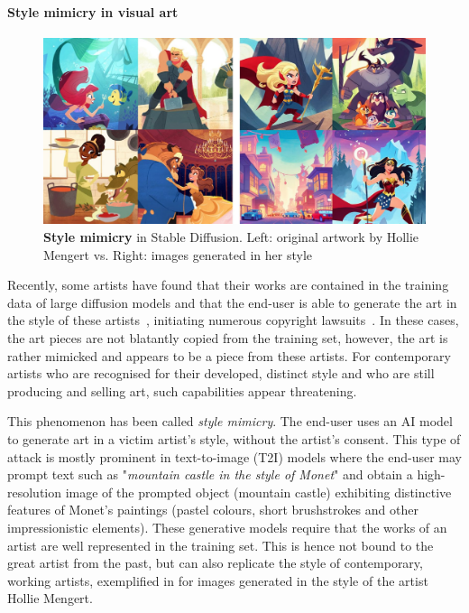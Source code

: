 \documentclass[conference]{IEEEtran}
\begin{document}
\paragraph{Style mimicry in visual art}
\begin{figure}[ht]
    \centering
    \includegraphics[width=\linewidth]{figures/mimicry.jpg}
    \caption{\textbf{Style mimicry} in Stable Diffusion. Left: original artwork by Hollie Mengert vs. Right: images generated in her style~\cite{baio_invasive_2022}}
    \label{fig:style-mimicry}
\end{figure}
Recently, some artists have found that their works are contained in the training data of large diffusion models and that the end-user is able to generate the art in the style of these artists~\cite{mit_technology_review_this_2022}, initiating numerous copyright lawsuits~\cite{nolan_ai_2023}.
In these cases, the art pieces are not blatantly copied from the training set, however, the art is rather mimicked and appears to be a piece from these artists.
For contemporary artists who are recognised for their developed, distinct style and who are still producing and selling art, such capabilities appear threatening.  

This phenomenon has been called \textit{style mimicry}. The end-user uses an AI model to generate art in a victim artist's style, without the artist's consent. 
This type of attack is mostly prominent in text-to-image (T2I) models where the end-user may prompt text such as "\textit{mountain castle in the style of Monet}" and obtain a high-resolution image of the prompted object (mountain castle) exhibiting distinctive features of Monet's paintings (pastel colours, short brushstrokes and other impressionistic elements). 
These generative models require that the works of an artist are well represented in the training set. This is hence not bound to the great artist from the past, but can also replicate the style of contemporary, working artists, exemplified in  for images generated in the style of the artist Hollie Mengert.
\end{document}
